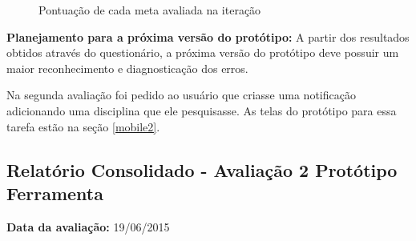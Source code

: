   \begin{figure}[h!]
  \centering
    \caption{Pontuação de cada meta avaliada na iteração}
    \label{fig:grafico1}
\end{figure}

  \textbf{Planejamento para a próxima versão do protótipo:}
  A partir dos resultados obtidos através do questionário, a próxima versão do protótipo deve possuir um maior reconhecimento e diagnosticação
  dos erros.

  \vfill
  \pagebreak

  Na segunda avaliação foi pedido ao usuário que criasse uma notificação adicionando uma disciplina que ele pesquisasse. As telas do protótipo para essa tarefa
  estão na seção \ref{mobile2}.
  
  \vfill

  \subsection{Relatório Consolidado - Avaliação 2 Protótipo Ferramenta}

  \flushleft \textbf{Data da avaliação:} 
  19/06/2015

